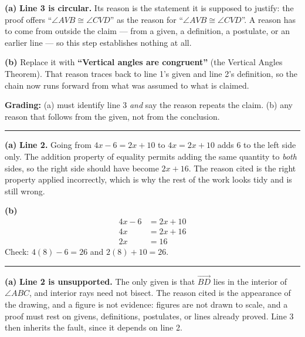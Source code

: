 \documentclass[12pt]{article}
\begin{document}



\textbf{(a)} \textbf{Line 3 is circular.} Its reason is the statement it is supposed to justify: the proof offers ``$\angle AVB \cong \angle CVD$'' as the reason for ``$\angle AVB \cong \angle CVD$''. A reason has to come from outside the claim --- from a given, a definition, a postulate, or an earlier line --- so this step establishes nothing at all.

\textbf{(b)} Replace it with \textbf{``Vertical angles are congruent''} (the Vertical Angles Theorem). That reason traces back to line 1's given and line 2's definition, so the chain now runs forward from what was assumed to what is claimed.

\textbf{Grading:} (a) must identify line 3 \emph{and} say the reason repeats the claim. (b) any reason that follows from the given, not from the conclusion.

\vspace{0.2cm}\noindent\rule{\linewidth}{0.2pt}


\textbf{(a)} \textbf{Line 2.} Going from $4x - 6 = 2x + 10$ to $4x = 2x + 10$ adds $6$ to the left side only. The addition property of equality permits adding the same quantity to \emph{both} sides, so the right side should have become $2x + 16$. The reason cited is the right property applied incorrectly, which is why the rest of the work looks tidy and is still wrong.

\textbf{(b)}
\begin{align*}
  4x - 6 &= 2x + 10 \\
  4x &= 2x + 16 \\
  2x &= 16
\end{align*}
Check: $4(8) - 6 = 26$ and $2(8) + 10 = 26$. 

\vspace{0.2cm}\noindent\rule{\linewidth}{0.2pt}


\textbf{(a)} \textbf{Line 2 is unsupported.} The only given is that $\overrightarrow{BD}$ lies in the interior of $\angle ABC$, and interior rays need not bisect. The reason cited is the appearance of the drawing, and a figure is not evidence: figures are not drawn to scale, and a proof must rest on givens, definitions, postulates, or lines already proved. Line 3 then inherits the fault, since it depends on line 2.
\end{document}
